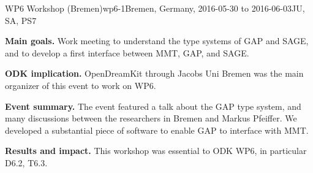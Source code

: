 \begin{event}{WP6 Workshop (Bremen)}{wp6-1}{Bremen, Germany, 2016-05-30 to 2016-06-03}{JU, SA, PS}{7}{}

\textbf{Main goals.} Work meeting to understand the type systems of GAP and
SAGE, and to develop a first interface between MMT, GAP, and SAGE.

\textbf{ODK implication.} OpenDreamKit through Jacobs Uni Bremen was the main organizer of this
event to work on WP6.

\textbf{Event summary.} The event featured a talk about the GAP type system, and
many discussions between the researchers in Bremen and Markus Pfeiffer. We
developed a substantial piece of software to enable GAP to interface with MMT.

\textbf{Results and impact.} 
This workshop was essential to ODK WP6, in particular D6.2, T6.3.

\end{event}